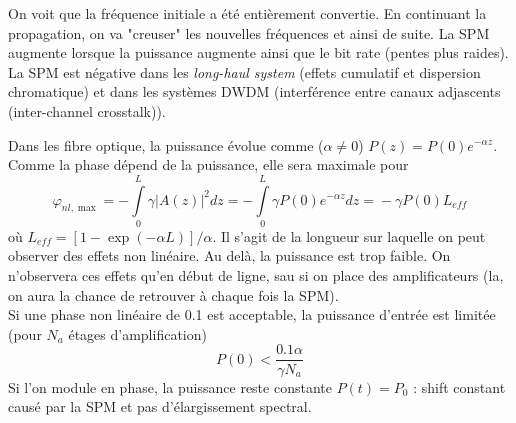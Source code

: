 On voit que la fréquence initiale a été entièrement convertie. En continuant la propagation, 
on va "creuser" les nouvelles fréquences et ainsi de suite. La SPM augmente lorsque la puissance
augmente ainsi que le bit rate (pentes plus raides). La SPM est négative dans les \textit{long-haul
system}  (effets cumulatif et dispersion chromatique) et dans les systèmes DWDM (interférence entre
canaux adjascents (inter-channel crosstalk)).

\newpage
Dans les fibre optique, la puissance évolue comme ($\alpha\neq 0$) $P(z) = P(0){e^{ - \alpha z}}$. 
Comme la phase dépend de la puissance, elle sera maximale pour
\begin{equation}
{\varphi _{nl,\max }} =  - \int\limits_0^L {\gamma {{\left| {A(z)} \right|}^2}dz} 
 =  - \int\limits_0^L {\gamma P(0){e^{ - \alpha z}}dz = }  - \gamma P(0){L_{eff}}
\end{equation}
où ${L_{eff}} = [1 - \exp ( - \alpha L)]/\alpha $. Il s'agit de la longueur sur laquelle on
peut observer des effets non linéaire. Au delà, la puissance est trop faible. On n'observera
ces effets qu'en début de ligne, sau si on place des amplificateurs (la, on aura la chance de 
retrouver à chaque fois la SPM).\\

Si une phase non linéaire de 0.1 est acceptable, la puissance d'entrée est limitée (pour 
$N_a$ étages d'amplification)
\begin{equation}
P(0) < \frac{{0.1\alpha }}{{\gamma {N_a}}}
\end{equation}
Si l'on module en phase, la puissance reste constante $P(t)=P_0$ : shift constant causé par la
SPM et pas d'élargissement spectral.


